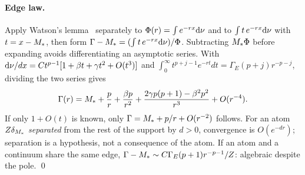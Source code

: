 \paragraph{Edge law.}
Apply Watson's lemma~\cite{dlmf} separately to $\Phi(r)=\int e^{-rx}\mathrm{d}\nu$ and
to $\int t\,e^{-rx}\mathrm{d}\nu$ with $t=x-M_{*}$, then form
$\Gamma-M_{*}=(\int t\,e^{-rx}\mathrm{d}\nu)/\Phi$. Subtracting $M_{*}\Phi$ before
expanding avoids differentiating an asymptotic series. With
$\mathrm{d}\nu/dx=Ct^{p-1}[1+\beta t+\gamma t^{2}+O(t^{3})]$ and
$\int_{0}^{\infty}t^{p+j-1}e^{-rt}dt=\Gamma_{E}(p+j)r^{-p-j}$, dividing the two
series gives
\begin{equation}
\Gamma(r)=M_{*}+\frac{p}{r}+\frac{\beta p}{r^{2}}
+\frac{2\gamma p(p+1)-\beta^{2}p^{2}}{r^{3}}+O(r^{-4}).
\end{equation}
If only $1+O(t)$ is known, only $\Gamma=M_{*}+p/r+O(r^{-2})$ follows. For an
atom $Z\delta_{M_{*}}$ \emph{separated} from the rest of the support by
$d>0$, convergence is $O(e^{-dr})$; separation is a hypothesis, not a
consequence of the atom. If an atom and a continuum share the same edge,
$\Gamma-M_{*}\sim C\Gamma_{E}(p+1)r^{-p-1}/Z$: algebraic despite the pole.
\qed
